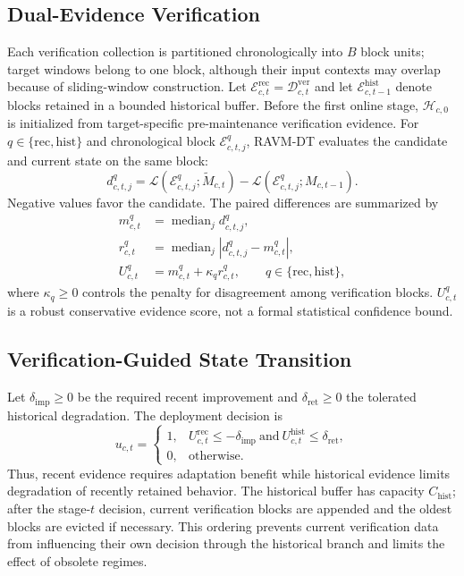 \subsection{Dual-Evidence Verification}
Each verification collection is partitioned chronologically into $B$ block units; target windows belong to one block, although their input contexts may overlap because of sliding-window construction. Let $\mathcal E^{\mathrm{rec}}_{c,t}=\mathcal D^{\mathrm{ver}}_{c,t}$ and let $\mathcal E^{\mathrm{hist}}_{c,t-1}$ denote blocks retained in a bounded historical buffer. Before the first online stage, $\mathcal H_{c,0}$ is initialized from target-specific pre-maintenance verification evidence. For $q\in\{\mathrm{rec},\mathrm{hist}\}$ and chronological block $\mathcal E^{q}_{c,t,j}$, RAVM-DT evaluates the candidate and current state on the same block:
\begin{equation}
d^{q}_{c,t,j}=\mathcal L\!\left(\mathcal E^{q}_{c,t,j};\widetilde M_{c,t}\right)-\mathcal L\!\left(\mathcal E^{q}_{c,t,j};M_{c,t-1}\right).
\label{eq:paired}
\end{equation}
Negative values favor the candidate. The paired differences are summarized by
\begin{equation}
\begin{aligned}
m^{q}_{c,t}&=\operatorname{median}_{j}d^{q}_{c,t,j},\\
r^{q}_{c,t}&=\operatorname{median}_{j}\left|d^{q}_{c,t,j}-m^{q}_{c,t}\right|,\\
U^{q}_{c,t}&=m^{q}_{c,t}+\kappa_q r^{q}_{c,t},\qquad q\in\{\mathrm{rec},\mathrm{hist}\},
\end{aligned}
\label{eq:evidence-score}
\end{equation}
where $\kappa_q\geq0$ controls the penalty for disagreement among verification blocks. $U^{q}_{c,t}$ is a robust conservative evidence score, not a formal statistical confidence bound.

\subsection{Verification-Guided State Transition}
Let $\delta_{\mathrm{imp}}\geq0$ be the required recent improvement and $\delta_{\mathrm{ret}}\geq0$ the tolerated historical degradation. The deployment decision is
\begin{equation}
u_{c,t}=\begin{cases}
1, & U^{\mathrm{rec}}_{c,t}\leq-\delta_{\mathrm{imp}}\ \text{and}\ U^{\mathrm{hist}}_{c,t}\leq\delta_{\mathrm{ret}},\\
0, & \text{otherwise}.
\end{cases}
\label{eq:commit-rule}
\end{equation}
Thus, recent evidence requires adaptation benefit while historical evidence limits degradation of recently retained behavior. The historical buffer has capacity $C_{\mathrm{hist}}$; after the stage-$t$ decision, current verification blocks are appended and the oldest blocks are evicted if necessary. This ordering prevents current verification data from influencing their own decision through the historical branch and limits the effect of obsolete regimes.

